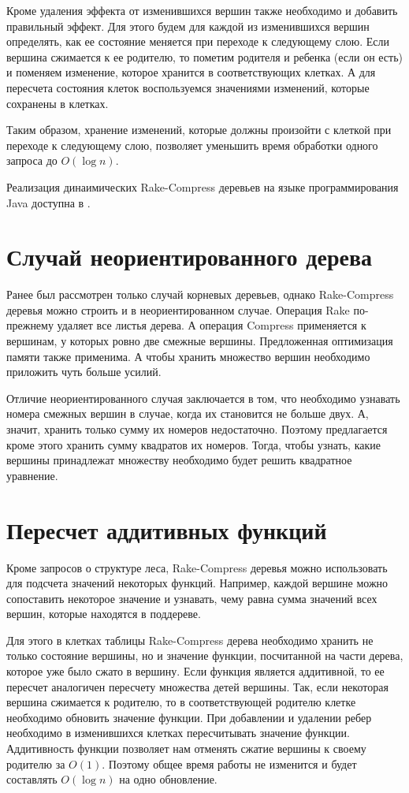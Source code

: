 Кроме удаления эффекта от изменившихся вершин также необходимо и добавить правильный эффект. 
Для этого будем для каждой из изменившихся вершин определять, как ее состояние меняется при переходе к следующему слою.
Если вершина сжимается к ее родителю, то пометим родителя и ребенка (если он есть) и поменяем изменение, которое хранится в соответствующих клетках. 
А для пересчета состояния клеток воспользуемся значениями изменений, которые сохранены в клетках.
  
Таким образом, хранение изменений, которые должны произойти с клеткой при переходе к следующему слою, позволяет уменьшить время обработки одного запроса до $O(\log n)$. 

Реализация динаимических Rake-Compress деревьев на языке программирования Java доступна в \cite{github}.

\FloatBarrier
\section{Случай неориентированного дерева}
\label{sec:undirected}

Ранее был рассмотрен только случай корневых деревьев, однако Rake-Compress деревья можно строить и в неориентированном случае.
Операция Rake по-прежнему удаляет все листья дерева. А операция Compress применяется к вершинам, у которых ровно две смежные вершины. 
Предложенная оптимизация памяти также применима. А чтобы хранить множество вершин необходимо приложить чуть больше усилий.

Отличие неориентированного случая заключается в том, что необходимо узнавать номера смежных вершин в случае, когда их становится не больше двух. 
А, значит, хранить только сумму их номеров недостаточно. Поэтому предлагается кроме этого хранить сумму квадратов их номеров. Тогда, чтобы узнать, 
какие вершины принадлежат множеству необходимо будет решить квадратное уравнение.

\FloatBarrier
\section{Пересчет аддитивных функций}

Кроме запросов о структуре леса, Rake-Compress деревья можно использовать для подсчета значений некоторых функций. 
Например, каждой вершине можно сопоставить некоторое значение и узнавать, чему равна сумма значений всех вершин, которые находятся в поддереве.

Для этого в клетках таблицы Rake-Compress дерева необходимо хранить не только состояние вершины, но и значение функции, посчитанной на части дерева, которое уже было сжато в вершину. 
Если функция является аддитивной, то ее пересчет аналогичен пересчету множества детей вершины. 
Так, если некоторая вершина сжимается к родителю, то в соответствующей родителю клетке необходимо обновить значение функции. 
При добавлении и удалении ребер необходимо в изменившихся клетках пересчитывать значение функции. 
Аддитивность функции позволяет нам отменять сжатие вершины к своему родителю за $O(1)$. Поэтому общее время работы не изменится и будет составлять $O(\log n)$ на одно обновление.

